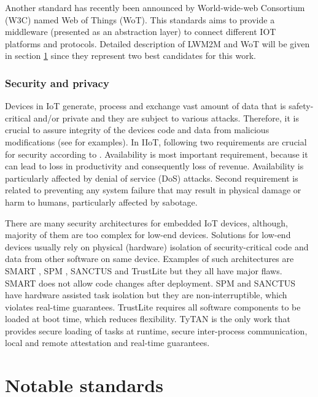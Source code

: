 Another standard has recently been announced by World-wide-web Consortium (W3C) named Web of Things (WoT). This standards aims to provide a middleware (presented as an abstraction layer) to connect different IOT platforms and protocols. Detailed description of LWM2M and WoT will be given in section \ref{section:NotableStandards} since they represent two best candidates for this work.


\subsubsection{Security and privacy}

Devices in IoT generate, process and exchange vast amount of data that is safety-critical and/or private and they are subject to various attacks. Therefore, it is crucial to assure integrity of the devices code and data from malicious modifications (see \cite{Control2014,SMATT,att,PUFatt,VIPER,CARMA,Short} for examples). In IIoT, following two requirements are crucial for security according to \cite{Sadeghi2015,1435744}. Availability is most important requirement, because it can lead to loss in productivity and consequently loss of revenue. Availability is particularly affected by denial of service (DoS) attacks. Second requirement is related to preventing any system failure that may result in physical damage or harm to humans, particularly affected by sabotage.

There are many security architectures for embedded IoT devices, although, majority of them are too complex for low-end devices. Solutions for low-end devices usually rely on physical (hardware) isolation of security-critical code and data from other software on same device. Examples of such architectures are SMART \cite{Smart}, SPM \cite{SPM}, SANCTUS \cite{Sanctus} and TrustLite \cite{TrustLite} but they all have major flaws. SMART does not allow code changes after deployment. SPM and SANCTUS have hardware assisted task isolation but they are non-interruptible, which violates real-time guarantees. TrustLite requires all software components to be loaded at boot time, which reduces flexibility. TyTAN \cite{Brasser} is the only work that provides secure loading of tasks at runtime, secure inter-process communication, local and remote attestation and real-time guarantees. 

\section{Notable standards}
\label{section:NotableStandards}

